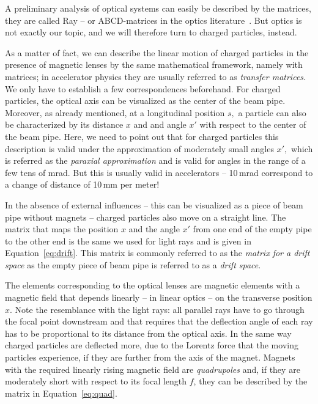 \documentclass{article}
\begin{document}
A preliminary analysis of optical systems can easily be described by the matrices,
they are called Ray -- or ABCD-matrices in the optics literature~\cite{SIEGMAN}. But
optics is not exactly our topic, and we will therefore turn to charged particles,
instead.
\par
As a matter of fact, we can describe the linear motion of charged particles in the 
presence of magnetic lenses by the same mathematical framework, namely with
matrices; in accelerator physics they are usually referred to as {\em transfer matrices.}
We only have to establish a few correspondences beforehand. For charged particles, 
the optical axis can be visualized as the center of the beam pipe. Moreover, as already mentioned, at a 
longitudinal position $s,$ a particle can also be characterized by its distance 
$x$ and and angle $x'$ with respect to the center of the beam pipe. Here, we need
to point out that for charged particles this description is valid under the approximation of moderately 
small angles $x',$ which is referred as the {\em paraxial approximation} and is valid 
for angles in the range of a few tens of mrad. But this is usually valid in
accelerators -- 10\,mrad correspond to a change of distance of 10\,mm per meter!
\par
In the absence of external influences -- this can be visualized as a piece of beam 
pipe without magnets -- charged particles also move on a straight line. The matrix 
that maps the position $x$ and the angle $x'$ from one end of the empty pipe to the other 
end is the same we used for light rays and is given in Equation~\ref{eq:drift}. 
This matrix is commonly referred to as the {\em matrix for a drift space} as the 
empty piece of beam pipe is referred to as a {\em drift space}. 
\par
The elements corresponding to the optical lenses are magnetic elements with a 
magnetic field that depends linearly -- in linear optics  -- on the transverse position $x$. Note the
resemblance with the light rays: all parallel rays have to go through the focal
point downstream and that requires that the deflection angle of each ray has to
be proportional to its distance from the optical axis. In the same way charged particles are deflected more, due to the Lorentz force that the moving 
particles experience, if they are further from the axis of the magnet. Magnets with 
the required linearly rising magnetic field are {\em quadrupoles} and, if they are
moderately short with respect to its focal length $f$, they can be described by the matrix in Equation~\ref{eq:quad}.
\end{document}
